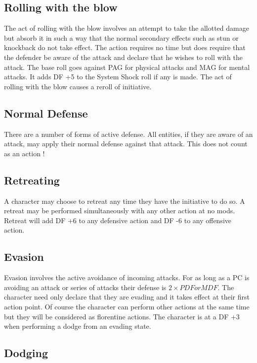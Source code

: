 \subsection{Rolling with the blow}

The act of rolling with the blow involves an attempt to take the
allotted damage but absorb it in such a way that the normal secondary
effects such as stun or knockback do not take effect. The action
requires no time but does require that the defender be aware of the
attack and declare that he wishes to roll with the attack. The base
roll goes against PAG for physical attacks and MAG for mental
attacks. It adds DF +5 to the System Shock roll if any is made.
The act of rolling with the blow causes a reroll of initiative.

\subsection{Normal Defense}

There are a number of forms of active defense. All entities, if they
are aware of an attack, may apply their normal defense against that
attack. This does not count as an action !

\subsection{Retreating}

A character may choose to retreat any time they have the initiative to do so.
A retreat may be performed simultaneously with any other action at no mods.
Retreat will add DF +6 to any defensive action and DF -6 to any offensive action.

\subsection{Evasion}

Evasion involves the active avoidance of incoming attacks. For as long
as a PC is avoiding an attack or series of attacks their defense is \( 2
\times PDF or MDF \). The character need only declare that they are evading and it takes effect at
their first action point. Of course the character can perform other actions
at the same time but they will be considered as florentine actions. The
character is at a DF +3 when performing a dodge from an evading state.

\subsection{Dodging}


